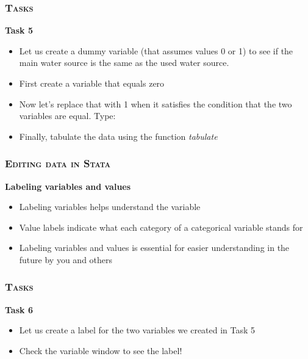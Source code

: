 \documentclass[10pt]{beamer}
\begin{document}
	
	\begin{frame}
		\frametitle{\textsc{Tasks}}
		\begin{center}
			\Large\textbf{Task 5}
		\end{center}
		\begin{itemize} 
			\item Let us create a dummy variable (that assumes values 0 or 1) to see if the main water source is the same as the used water source. 
			\item First create a variable that equals zero
		\end{itemize}
\begin{stlog}\end{stlog}
		\begin{itemize}
			\item Now let’s replace that with 1 when it satisfies the condition that the two variables are equal. Type:
		\end{itemize}
\begin{stlog}\end{stlog}
		\begin{itemize}
			\item Finally, tabulate the data using the function \textit{tabulate}
		\end{itemize}		
	\end{frame}
	
	\begin{frame}
		\frametitle{\textsc{Editing data in Stata}}
		\begin{center}
			\Large\textbf{Labeling variables and values}
		\end{center}
		\begin{itemize}	
			\item Labeling variables helps understand the variable 
			\item Value labels indicate what each category of a categorical variable stands for
			\item Labeling variables and values is essential for easier understanding in the future by you and others
		\end{itemize}
	\end{frame}
		
	\begin{frame}
		\frametitle{\textsc{Tasks}}
		\begin{center}	
			\Large\textbf{Task 6}
		\end{center}
		\begin{itemize}
			\item Let us create a label for the two variables we created in Task 5
		\end{itemize}
\begin{stlog}\end{stlog}
	
		\begin{itemize}
			\item Check the variable window to see the label!
		\end{itemize}		
	\end{frame}	
	
\end{document}
